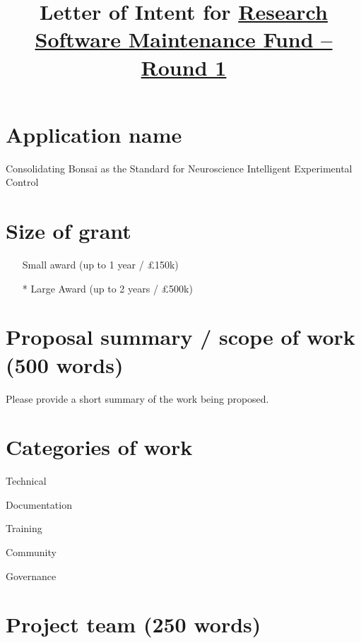 \documentclass[12pt]{article}
\title{Letter of Intent for \href{https://www.software.ac.uk/research-software-maintenance-fund/round-1}{Research Software Maintenance Fund -- Round 1}}
\author{}
\makeatletter
\newcommand*{\radiobutton}{%
  \@ifstar{\@radiobutton0}{\@radiobutton1}%
}
\newcommand*{\@radiobutton}[1]{%
  \begin{tikzpicture}
    \pgfmathsetlengthmacro\radius{height("X")/2}
    \draw[radius=\radius] circle;
    \ifcase#1 \fill[radius=.6*\radius] circle;\fi
  \end{tikzpicture}%
}
\newcommand{\cmark}{\ding{51}}%
\newcommand{\done}{\rlap{$\square$}{\raisebox{2pt}{\large\hspace{1pt}\cmark}}%
\hspace{-2.5pt}}
\newenvironment{instruction}{\par\color{red}}{\par}
\makeatother
\begin{document}
\maketitle

\section{Application name}

Consolidating Bonsai as the Standard for Neuroscience Intelligent Experimental Control

\section{Size of grant}

\begin{itemize}
\item[\radiobutton] Small award (up to 1 year / £150k)
\item[\radiobutton*] Large Award (up to 2 years / £500k)
\end{itemize}

\section{Proposal summary / scope of work (500 words)}

\begin{instruction}

Please provide a short summary of the work being proposed.

\end{instruction}



\section{Categories of work}

\begin{todolist}
	\item Technical
	\item[\done] Documentation
	\item[\done] Training
	\item[\done] Community
    \item[\done] Governance
\end{todolist}

\section{Project team (250 words)}
\end{document}
